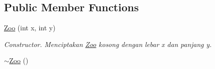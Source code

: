 \subsection*{Public Member Functions}
\begin{DoxyCompactItemize}
\item 
\hyperlink{classZoo_adf395cbec3675cdf23b9ae6f559f5ccf}{Zoo} (int x, int y)
\begin{DoxyCompactList}\small\item\em Constructor. Menciptakan \hyperlink{classZoo}{Zoo} kosong dengan lebar x dan panjang y. \end{DoxyCompactList}\item 
\hyperlink{classZoo_ab65ebe1fa60f6cf2a7cc55f78ff06ba5}{$\sim$\+Zoo} ()\hypertarget{classZoo_ab65ebe1fa60f6cf2a7cc55f78ff06ba5}{}\label{classZoo_ab65ebe1fa60f6cf2a7cc55f78ff06ba5}


\end{DoxyCompactItemize}
